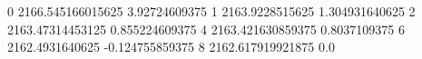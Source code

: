 0 2166.545166015625 3.92724609375
1 2163.9228515625 1.304931640625
2 2163.47314453125 0.855224609375
4 2163.421630859375 0.8037109375
6 2162.4931640625 -0.124755859375
8 2162.617919921875 0.0
